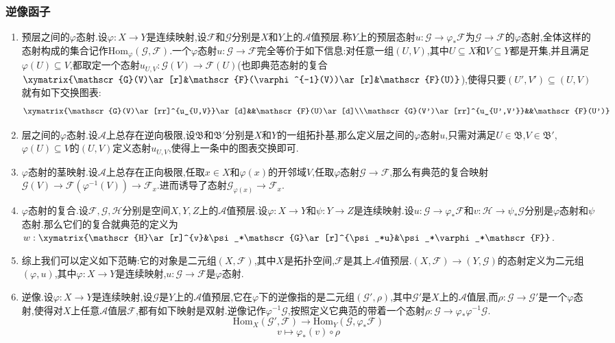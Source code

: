 \subsubsection{逆像函子}

\begin{enumerate}
	\item 预层之间的$\varphi$态射.设$\varphi:X\to Y$是连续映射,设$\mathscr{F}$和$\mathscr{G}$分别是$X$和$Y$上的$\mathscr{A}$值预层.称$Y$上的预层态射$u:\mathscr{G}\to\varphi_*\mathscr{F}$为$\mathscr{G}\to\mathscr{F}$的$\varphi$态射,全体这样的态射构成的集合记作$\mathrm{Hom}_{\varphi}(\mathscr{G},\mathscr{F})$.一个$\varphi$态射$u:\mathscr{G}\to\mathscr{F}$完全等价于如下信息:对任意一组$(U,V)$,其中$U\subseteq X$和$V\subseteq Y$都是开集,并且满足$\varphi(U)\subseteq V$,都取定一个态射$u_{U,V}:\mathscr{G}(V)\to\mathscr{F}(U)$(也即典范态射的复合$\xymatrix{\mathscr{G}(V)\ar[r]&\mathscr{F}(\varphi^{-1}(V))\ar[r]&\mathscr{F}(U)}$),使得只要$(U',V')\subseteq(U,V)$就有如下交换图表:
	$$\xymatrix{\mathscr{G}(V)\ar[rr]^{u_{U,V}}\ar[d]&&\mathscr{F}(U)\ar[d]\\\mathscr{G}(V')\ar[rr]^{u_{U',V'}}&&\mathscr{F}(U')}$$
	\item 层之间的$\varphi$态射.设$\mathscr{A}$上总存在逆向极限,设$\mathfrak{B}$和$\mathfrak{B}'$分别是$X$和$Y$的一组拓扑基,那么定义层之间的$\varphi$态射$u$,只需对满足$U\in\mathfrak{B}$,$V\in\mathfrak{B}'$,$\varphi(U)\subseteq V$的$(U,V)$定义态射$u_{U,V}$,使得上一条中的图表交换即可.
	\item $\varphi$态射的茎映射.设$\mathscr{A}$上总存在正向极限,任取$x\in X$和$\varphi(x)$的开邻域$V$,任取$\varphi$态射$\mathscr{G}\to\mathscr{F}$,那么有典范的复合映射$\mathscr{G}(V)\to\mathscr{F}(\varphi^{-1}(V))\to\mathscr{F}_x$.进而诱导了态射$\mathscr{G}_{\varphi(x)}\to\mathscr{F}_x$.
	\item $\varphi$态射的复合.设$\mathscr{F},\mathscr{G},\mathscr{H}$分别是空间$X,Y,Z$上的$\mathscr{A}$值预层.设$\varphi:X\to Y$和$\psi:Y\to Z$是连续映射.设$u:\mathscr{G}\to\varphi_*\mathscr{F}$和$v:\mathscr{H}\to\psi_*\mathscr{G}$分别是$\varphi$态射和$\psi$态射.那么它们的复合就典范的定义为$w:\xymatrix{\mathscr{H}\ar[r]^{v}&\psi_*\mathscr{G}\ar[r]^{\psi_*u}&\psi_*\varphi_*\mathscr{F}}$.
	\item 综上我们可以定义如下范畴:它的对象是二元组$(X,\mathscr{F})$,其中$X$是拓扑空间,$\mathscr{F}$是其上$\mathscr{A}$值预层.$(X,\mathscr{F})\to(Y,\mathscr{G})$的态射定义为二元组$(\varphi,u)$,其中$\varphi:X\to Y$是连续映射,$u:\mathscr{G}\to\mathscr{F}$是$\varphi$态射.
	\item 逆像.设$\varphi:X\to Y$是连续映射,设$\mathscr{G}$是$Y$上的$\mathscr{A}$值预层,它在$\varphi$下的逆像指的是二元组$(\mathscr{G}',\rho)$,其中$\mathscr{G}'$是$X$上的$\mathscr{A}$值层,而$\rho:\mathscr{G}\to\mathscr{G}'$是一个$\varphi$态射,使得对$X$上任意$\mathscr{A}$值层$\mathscr{F}$,都有如下映射是双射.逆像记作$\varphi^{-1}\mathscr{G}$,按照定义它典范的带着一个态射$\rho:\mathscr{G}\to\varphi_*\varphi^{-1}\mathscr{G}$.
	$$\mathrm{Hom}_X(\mathscr{G}',\mathscr{F})\to\mathrm{Hom}_Y(\mathscr{G},\varphi_*\mathscr{F})$$
	$$v\mapsto\varphi_*(v)\circ\rho$$
	

\end{enumerate}

